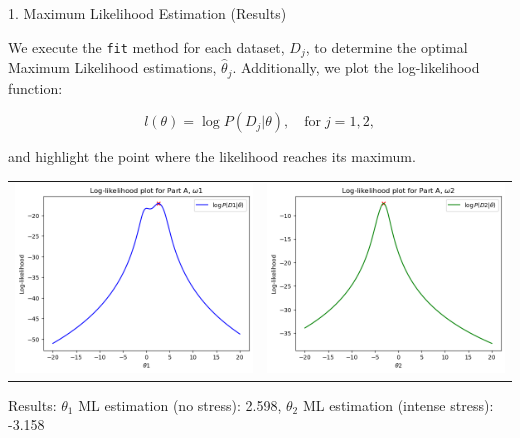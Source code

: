 \documentclass[aspectratio=169,xcolor=dvipsnames]{beamer}
\begin{document}

\begin{frame}{1. Maximum Likelihood Estimation (Results)}

    We execute the \texttt{fit} method for each dataset, $D_j$, to determine the optimal Maximum Likelihood estimations, $\hat{\theta}_j$. Additionally, we plot the log-likelihood function:

    \vspace{-10pt}

    $$ l(\theta) = \log P(D_j | \theta), \quad \text{for} \; j = 1, 2, $$
    
    and highlight the point where the likelihood reaches its maximum.

    \begin{table}
        \centering
        \begin{tabular}{cc}
            \includegraphics[width=0.4\linewidth]{out/plot1_MLE1.png} &
            \includegraphics[width=0.4\linewidth]{out/plot2_MLE2.png} \\
        \end{tabular}
        \label{tab:1}
    \end{table}

    \vspace{-10pt}

    Results: $\theta_1$ ML estimation (no stress): 2.598, $\theta_2$ ML estimation (intense stress): -3.158
    
\end{frame}

\end{document}
